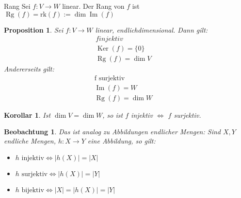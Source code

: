 \documentclass[11pt]{article}
\DeclareMathOperator{\mdim}{dim}
\DeclareMathOperator{\mKer}{Ker}
\DeclareMathOperator{\mIm}{Im}
\DeclareMathOperator{\mRg}{Rg}
\newtheorem{beobachtung}{Beobachtung}
\newtheorem*{proposition}{Proposition}
\newtheorem*{korollar}{Korollar}
\begin{document}
\begin{definition}{Rang}{}
Sei $f:V\to W$ linear. Der Rang von \(f\) ist $\mRg(f) = \text{rk}(f) := \dim\mIm(f)$
\end{definition}

\begin{proposition} Sei \(f:V\to W\) linear, endlichdimensional.
Dann gilt:
\begin{align*}
	f injektiv &
	\\ \mKer(f) = \{0\}  &
	\\ \mRg(f) = \dim V &
\end{align*}
Andererseits gilt:
\begin{align*}
	\text{f surjektiv}
	\\ \mIm(f) = W  &
	\\ \mRg(f) = \dim W &
\end{align*}
\end{proposition}

\begin{korollar} Ist \(\mdim V = \mdim W \), so ist \(f\) injektiv $\iff $ \(f\) surjektiv.\end{korollar}
\begin{beobachtung}
	Das ist analog zu Abbildungen endlicher Mengen: Sind \(X,Y\) endliche Mengen, \(h: X\to Y\) eine Abbildung, so gilt:
	\begin{itemize}
		\item \(h\text{ injektiv} \iff |h(X)| = |X| \)
		\item \(h\text{ surjektiv} \iff |h(X)| = |Y| \)
		\item \(h\text{ bijektiv} \iff |X|=|h(X)|=|Y| \)
	\end{itemize}
\end{beobachtung}
\end{document}
